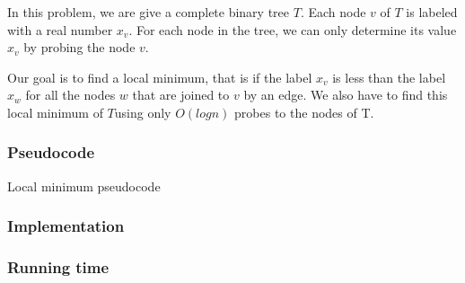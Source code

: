 \documentclass{article}
\begin{document}
In this problem, we are give a complete binary tree $T$. Each node $v$ of $T$ is labeled with a real number $x_v$. For each node in the tree, we can only determine its value $x_v$ by probing the node $v$.

Our goal is to find a local minimum, that is if the label $x_v$ is less than the label $x_w$ for all the nodes $w$ that are joined to $v$ by an edge.  We also have to find this local minimum of $T$using only $O(log n)$ probes to the nodes of T.

\subsubsection*{Pseudocode}

\begin{algorithm}[H]
\caption{Local minimum pseudocode}
\begin{algorithmic}[1]
\end{algorithmic}
\end{algorithm}

\subsubsection*{Implementation}

\subsubsection*{Running time}
\end{document}
